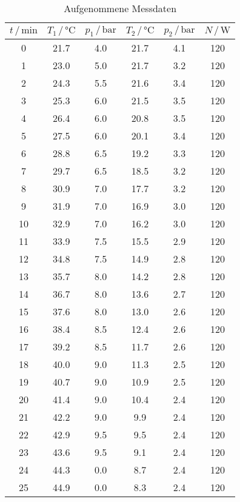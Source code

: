 \begin{table}[H]
\centering
\caption{Aufgenommene Messdaten}
\label{tab:Messdaten}
\begin{tabular}{c c c c c c}
\toprule
$t \,/\, \si{\minute}$ &
$T_1 \,/\, \si{\celsius}$ &
$p_1 \,/\, \si{\bar}$ &
$T_2 \,/\, \si{\celsius}$ &
$p_2 \,/\, \si{\bar}$ &
$N \,/\, \si{\watt}$ \\
\midrule
%
0	 & 21.7 & 4.0  & 21.7 & 4.1 & 120 \\
1  & 23.0 & 5.0  & 21.7 & 3.2	& 120 \\
2  & 24.3 & 5.5  & 21.6 & 3.4	& 120 \\
3  & 25.3 & 6.0  & 21.5 & 3.5	& 120 \\
4  & 26.4 & 6.0  & 20.8 & 3.5	& 120 \\
5  & 27.5 & 6.0  & 20.1 & 3.4	& 120 \\
6  & 28.8 & 6.5  & 19.2 & 3.3	& 120 \\
7  & 29.7 & 6.5  & 18.5 & 3.2	& 120 \\
8  & 30.9 & 7.0  & 17.7 & 3.2	& 120 \\
9  & 31.9 & 7.0  & 16.9 & 3.0	& 120 \\
10 & 32.9 & 7.0  & 16.2 & 3.0	& 120 \\
11 & 33.9 & 7.5  & 15.5 & 2.9	& 120 \\
12 & 34.8 & 7.5  & 14.9 & 2.8	& 120 \\
13 & 35.7 & 8.0  & 14.2 & 2.8	& 120 \\
14 & 36.7 & 8.0  & 13.6 & 2.7	& 120 \\
15 & 37.6 & 8.0  & 13.0 & 2.6	& 120 \\
16 & 38.4 & 8.5  & 12.4 & 2.6	& 120 \\
17 & 39.2 & 8.5  & 11.7 & 2.6	& 120 \\
18 & 40.0 & 9.0  & 11.3 & 2.5	& 120 \\
19 & 40.7 & 9.0  & 10.9 & 2.5	& 120 \\
20 & 41.4 & 9.0  & 10.4 & 2.4	& 120 \\
21 & 42.2 & 9.0  & 9.9  & 2.4	& 120 \\
22 & 42.9 & 9.5  & 9.5  & 2.4	& 120 \\
23 & 43.6 & 9.5  & 9.1  & 2.4	& 120 \\
24 & 44.3 & 0.0	 & 8.7  & 2.4	& 120 \\
25 & 44.9 & 0.0	 & 8.3  & 2.4	& 120 \\

\end{tabular}
\end{table}
